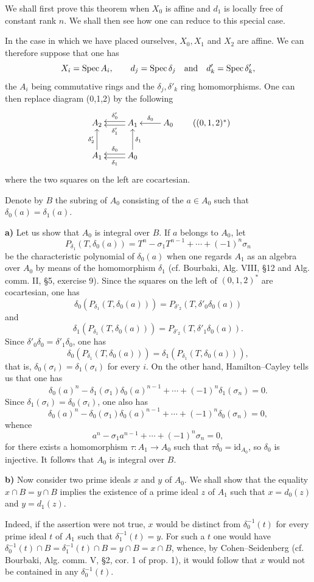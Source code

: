 We shall first prove this theorem when $X_0$ is affine and $d_1$ is locally free of constant rank $n$. We shall then see how one can reduce to this special case.

In the case in which we have placed ourselves, $X_0,X_1$ and $X_2$ are affine. We can therefore suppose that one has
\[
X_i=\operatorname{Spec} A_i,\qquad d_j=\operatorname{Spec}\delta_j\quad\text{and}\quad d'_k=\operatorname{Spec}\delta'_k,
\]
the $A_i$ being commutative rings and the $\delta_j,\delta'_k$ ring homomorphisms. One can then replace diagram (0,1,2) by the following
\[
\xymatrix{A_2&A_1\ar@<.5ex>[l]^{\delta'_1}\ar@<-.5ex>[l]_{\delta'_0}&A_0\ar[l]_{\delta_0}\\A_1\ar[u]^{\delta'_2}&A_0\ar@<.5ex>[l]^{\delta_1}\ar@<-.5ex>[l]_{\delta_0}\ar[u]_{\delta_1}&}\tag{$(0,1,2)^*$}
\]
where the two squares on the left are cocartesian.

Denote by $B$ the subring of $A_0$ consisting of the $a\in A_0$ such that $\delta_0(a)=\delta_1(a)$.

\textbf{a)} Let us show that $A_0$ is integral over $B$. If $a$ belongs to $A_0$, let
\[
P_{\delta_1}(T,\delta_0(a))=T^n-\sigma_1T^{n-1}+\cdots+(-1)^n\sigma_n
\]
be the characteristic polynomial of $\delta_0(a)$ when one regards $A_1$ as an algebra over $A_0$ by means of the homomorphism $\delta_1$ (cf. Bourbaki, Alg. VIII, §12 and Alg. comm. II, §5, exercise 9). Since the squares on the left of $(0,1,2)^*$ are cocartesian, one has
\[
\delta_0(P_{\delta_1}(T,\delta_0(a)))=P_{\delta'_2}(T,\delta'_0\delta_0(a))
\]
and
\[
\delta_1(P_{\delta_1}(T,\delta_0(a)))=P_{\delta'_2}(T,\delta'_1\delta_0(a)).
\]
Since $\delta'_0\delta_0=\delta'_1\delta_0$, one has
\[
\delta_0(P_{\delta_1}(T,\delta_0(a)))=\delta_1(P_{\delta_1}(T,\delta_0(a))),
\]
that is, $\delta_0(\sigma_i)=\delta_1(\sigma_i)$ for every $i$. On the other hand, Hamilton--Cayley tells us that one has
\[
\delta_0(a)^n-\delta_1(\sigma_1)\delta_0(a)^{n-1}+\cdots+(-1)^n\delta_1(\sigma_n)=0.
\]
Since $\delta_1(\sigma_i)=\delta_0(\sigma_i)$, one also has
\[
\delta_0(a)^n-\delta_0(\sigma_1)\delta_0(a)^{n-1}+\cdots+(-1)^n\delta_0(\sigma_n)=0,
\]
whence
\[
a^n-\sigma_1a^{n-1}+\cdots+(-1)^n\sigma_n=0,
\]
for there exists a homomorphism $\tau:A_1\to A_0$ such that $\tau\delta_0=\mathrm{id}_{A_0}$, so $\delta_0$ is injective. It follows that $A_0$ is integral over $B$.

\textbf{b)} Now consider two prime ideals $x$ and $y$ of $A_0$. We shall show that the equality $x\cap B=y\cap B$ implies the existence of a prime ideal $z$ of $A_1$ such that $x=d_0(z)$ and $y=d_1(z)$.

Indeed, if the assertion were not true, $x$ would be distinct from $\delta_0^{-1}(t)$ for every prime ideal $t$ of $A_1$ such that $\delta_1^{-1}(t)=y$. For such a $t$ one would have $\delta_0^{-1}(t)\cap B=\delta_1^{-1}(t)\cap B=y\cap B=x\cap B$, whence, by Cohen--Seidenberg (cf. Bourbaki, Alg. comm. V, §2, cor. 1 of prop. 1), it would follow that $x$ would not be contained in any $\delta_0^{-1}(t)$.
